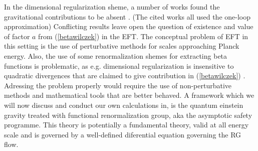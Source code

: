 \documentclass[11pt, a4paper]{article}
\begin{document}
In the dimensional regularization sheme, a number of works found the gravitational contributions to be absent \cite{nieuwenhuizen}\cite{absence}.
(The cited works all used the one-loop approximation)
Conflicting results leave open the question of existence and value of factor $a$ from (\ref{betawilczek}) in the EFT.
The conceptual problem of EFT in this setting is the use of perturbative methods for scales approaching Planck energy.
Also, the use of some renormalization shemes for extracting beta functions is problematic, as e.g. dimensional regularization is insensitive to quadratic
divergences that are claimed to give contribution in (\ref{betawilczek}) \cite{absence}.
Adressing the problem properly would require the use of non-perturbative methods and mathematical tools that are better behaved.
A framework which we will now discuss and conduct our own calculations in, is the quantum einstein gravity treated with functional renormalization group, aka the asymptotic safety programme.
This theory is potentially a fundamental theory, valid at all energy scale \cite{qeg} and is governed by a well-defined diferential equation governing the RG flow.




\end{document}
